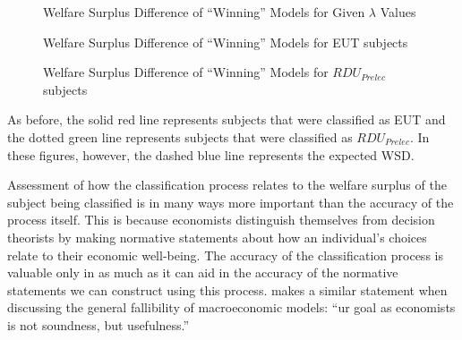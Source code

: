 \documentclass[../main.tex]{subfiles}
\begin{document}
\begin{figure}[ht!]
	\center
	\caption{Welfare Surplus Difference of \enquote{Winning} Models for Given $\lambda$ Values}
	\label{fig:HN1_wel_mu}
\end{figure}

\begin{figure}[hb!]
	\center
	\caption{Welfare Surplus Difference of \enquote{Winning} Models for EUT subjects}
	\label{fig:HN1_wel_eut}
\end{figure}

\begin{figure}[ht!]
	\center
	\caption{Welfare Surplus Difference of \enquote{Winning} Models for $\mathit{RDU_{Prelec}}$ subjects}
	\label{fig:HN1_wel_pre}
\end{figure}

As before, the solid red line represents subjects that were classified as EUT and the dotted green line represents subjects that were classified as $\mathit{RDU_{Prelec}}$.
In these figures, however, the dashed blue line represents the expected WSD.

Assessment of how the classification process relates to the welfare surplus of the subject being classified is in many ways more important than the accuracy of the process itself.
This is because economists distinguish themselves from decision theorists by making normative statements about how an individual's choices relate to their economic well-being.
The accuracy of the classification process is valuable only in as much as it can aid in the accuracy of the normative statements we can construct using this process.
\textcite[25]{Leamer2012} makes a similar statement when discussing the general fallibility of macroeconomic models: \enquote{ur goal as economists is not soundness, but usefulness.}
\end{document}
